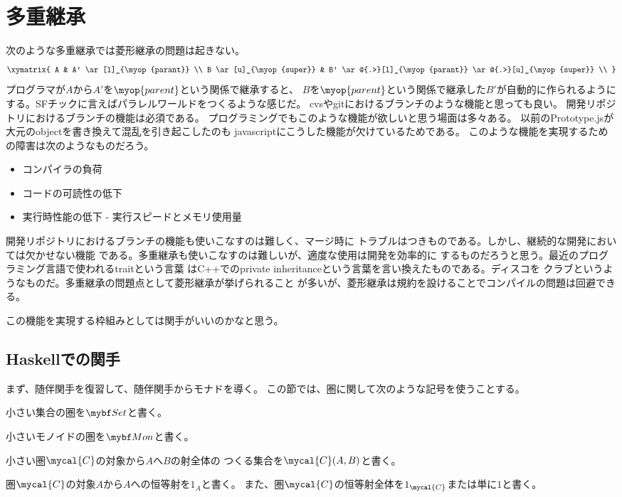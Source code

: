 {\section{多重継承}\label{s1:多重継承} %
	次のような多重継承では菱形継承の問題は起きない。
	\begin{equation*}\xymatrix{
		A & A' \ar[l]_{\myop{parant}} \\
		B \ar[u]_{\myop{super}} 
		& B' \ar@{.>}[l]_{\myop{parant}} \ar@{.>}[u]_{\myop{super}} \\
	}\end{equation*}
	プログラマが$A$から$A'$を$\myop{parent}$という関係で継承すると、
	$B$を$\myop{parent}$という関係で継承した$B'$が自動的に作られるように
	する。SFチックに言えばパラレルワールドをつくるような感じだ。
	cvsやgitにおけるブランチのような機能と思っても良い。
	開発リポジトリにおけるブランチの機能は必須である。
	プログラミングでもこのような機能が欲しいと思う場面は多々ある。
	以前のPrototype.jsが大元のobjectを書き換えて混乱を引き起こしたのも
	javascriptにこうした機能が欠けているためである。
	このような機能を実現するための障害は次のようなものだろう。
	\begin{itemize}\setlength{\itemsep}{-1mm} %
		\item コンパイラの負荷
		\item コードの可読性の低下
		\item 実行時性能の低下 - 実行スピードとメモリ使用量
	\end{itemize} %
	開発リポジトリにおけるブランチの機能も使いこなすのは難しく、マージ時に
	トラブルはつきものである。しかし、継続的な開発においては欠かせない機能
	である。多重継承も使いこなすのは難しいが、適度な使用は開発を効率的に
	するものだろうと思う。最近のプログラミング言語で使われるtraitという言葉
	はC++でのprivate inheritanceという言葉を言い換えたものである。ディスコを
	クラブというようなものだ。多重継承の問題点として菱形継承が挙げられること
	が多いが、菱形継承は規約を設けることでコンパイルの問題は回避できる。

	この機能を実現する枠組みとしては関手がいいのかなと思う。

\subsection{Haskellでの関手}\label{s2:Haskellでの関手} %
	まず、随伴関手を復習して、随伴関手からモナドを導く。
	この節では、圏に関して次のような記号を使うことする。
	\begin{description}\setlength{\itemsep}{-1mm} %
		\item[集合の圏] 小さい集合の圏を$\catSet$と書く。
		\item[モノイドの圏] 小さいモノイドの圏を$\catMon$と書く。
		\item[$\Hom$集合] 小さい圏$\mycal{C}$の対象から$A$へ$B$の射全体の
		つくる集合を$\mycal{C}(A,B)$と書く。
		\item[恒等射] 圏$\mycal{C}$の対象$A$から$A$への恒等射を$1_A$と書く。
		また、圏$\mycal{C}$の恒等射全体を$1_{\mycal{C}}$または単に$1$と書く。
	\end{description} %

}
